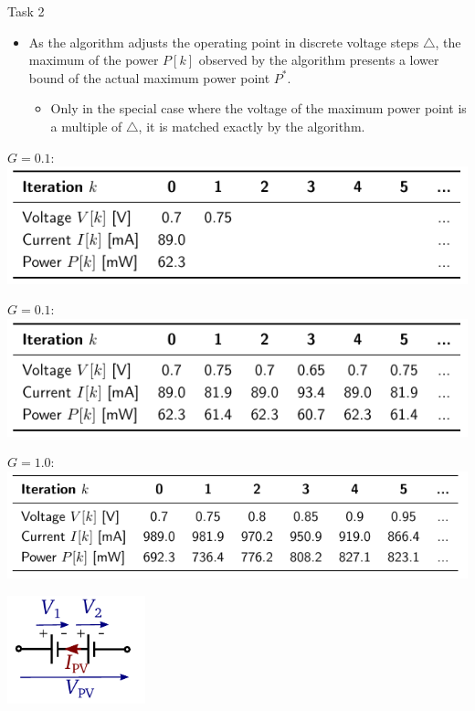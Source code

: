 \begin{frame}[allowframebreaks]{Task 2}{}
\begin{requirementsnoinc}
\begin{itemize}
       \item As the algorithm adjusts the operating point in discrete voltage steps $\triangle$, the maximum of the power $P[k]$ observed by the algorithm presents a lower bound of the actual maximum power point $P^{*}$.
        \begin{itemize}
          \item Only in the special case where the voltage of the maximum power point is a multiple of $\triangle$, it is matched exactly by the algorithm.
        \end{itemize}
    \end{itemize}
  \end{requirementsnoinc}
  \framebreak
  \begin{solutionnoinc}
     $G = 0.1$:
    \includegraphics[width=\textwidth]{./figures/task2_sol2_empty.png}
  \end{solutionnoinc}
  \framebreak
  \begin{solutionnoinc}
     $G = 0.1$:
    \includegraphics[width=\textwidth]{./figures/task2_sol2.png}
  \end{solutionnoinc}
  \begin{solution}
     $G = 1.0$:
    \includegraphics[width=\textwidth]{./figures/task2_sol3.png}
  \end{solution}
  \begin{tasknoinc}
    \centering
    \includegraphics[width=0.3\textwidth]{./figures/task3_photovoltaic_panel.png}

\end{tasknoinc}
\end{frame}
